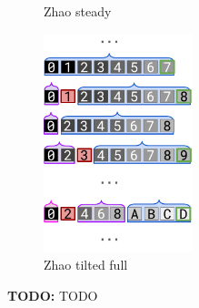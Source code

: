 \begin{figure}
\begin{subfigure}{0.25\linewidth}
\caption{Zhao steady}
\label{fig:surface-control:zhao-steady}
\end{subfigure}%
\begin{subfigure}{0.25\linewidth}
\centering
\includegraphics[height=2.5in]{img/surface-control-zhao-tilted-ext}
\caption{Zhao tilted full}
\label{fig:surface-control:zhao-tilted-ext}
\end{subfigure}%

\caption{%
\textbf{TODO:}
\footnotesize
TODO
}
\label{fig:surface-control}

\end{figure}
